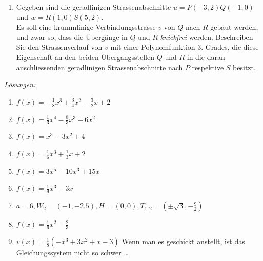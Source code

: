 \begin{ueb}{}{}
\begin{enumerate}
		\item Gegeben sind die geradlinigen Strassenabschnitte \( u = P(-3, 2)Q(-1, 0) \) und \( w = R(1, 0)S(5, 2) \).\\
		      Es soll eine krummlinige Verbindungsstrasse \( v \) von \( Q \) nach \( R \) gebaut werden, und zwar so, dass die Übergänge in \( Q \) und \( R \) \emph{knickfrei} werden. Beschreiben Sie den Strassenverlauf von \( v \) mit einer Polynomfunktion 3. Grades, die diese Eigenschaft an den beiden Übergangsstellen \( Q \) und \( R \) in die daran anschliessenden geradlinigen Strassenabschnitte nach \( P \) respektive \( S \) besitzt.
	\end{enumerate}

\end{ueb}

\clearpage
\emph{Lösungen:}
\begin{enumerate}
	\item \( f(x) = -\frac{1}{8}x^3 + \frac{3}{4}x^2 - \frac{3}{2}x + 2 \)
	\item \( f(x) = \frac{1}{3}x^4 - \frac{8}{3}x^3 + 6x^2 \)
	\item \( f(x) = x^3 - 3x^2 + 4 \)
	\item \( f(x) = \frac{1}{6}x^3 + \frac{1}{3}x + 2 \)
	\item \( f(x) = 3x^5 - 10x^3 + 15x \)
	\item \( f(x) = \frac{1}{9}x^3 - 3x \)
	\item $a=6, W_2 =(-1, -2.5), H=(0,0), T_{1,2} = \left(\pm\sqrt{3}, -\frac{9}{2}\right)$
	\item $f(x) = \frac{1}{6} x^2 - \frac{2}{3}$
	\item $v(x) = \frac{1}{8}\left(-x^3+3x^2+x-3\right)$ Wenn man es geschickt anstellt, ist das Gleichungssystem nicht so schwer \dots
\end{enumerate}

